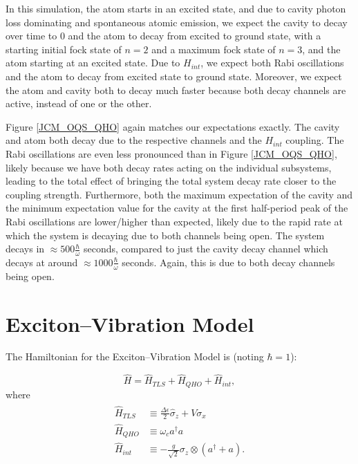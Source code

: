 \documentclass[12pt]{article}
\begin{document}
In this simulation, the atom starts in an excited state, and due to cavity photon loss dominating and spontaneous atomic emission, we expect the cavity to decay over time to 0 and the atom to decay from excited to ground state, with a starting initial fock state of $n=2$ and a maximum fock state of $n=3$, and the atom starting at an excited state. Due to $H_{int}$, we expect both Rabi oscillations and the atom to decay from excited state to ground state. Moreover, we expect the atom and cavity both to decay much faster because both decay channels are active, instead of one or the other. 

Figure \ref{JCM_OQS_QHO} again matches our expectations exactly. The cavity and atom both decay due to the respective channels and the $H_{int}$ coupling. The Rabi oscillations are even less pronounced than in Figure \ref{JCM_OQS_QHO}, likely because we have both decay rates acting on the individual subsystems, leading to the total effect of bringing the total system decay rate closer to the coupling strength. Furthermore, both the maximum expectation of the cavity and the minimum expectation value for the cavity at the first half-period peak of the Rabi oscillations are lower/higher than expected, likely due to the rapid rate at which the system is decaying due to both channels being open. The system decays in $\approx 500 \frac{\hbar}{\omega}$ seconds, compared to just the cavity decay channel which decays at around $\approx 1000 \frac{\hbar}{\omega}$ seconds. Again, this is due to both decay channels being open.

\section{Exciton--Vibration Model}

The Hamiltonian for the Exciton--Vibration Model is (noting $\hbar = 1$):

\begin{equation}
    \hat{H} = \hat{H}_{TLS} + \hat{H}_{QHO} + \hat{H}_{int}, 
\end{equation} \label{EV_H}
where 
\begin{align*}
    \begin{aligned}
        \hat{H}_{TLS} &\equiv \frac{\Delta\epsilon}{2}\hat{\sigma}_z + V\sigma_x \\
        \hat{H}_{QHO} &\equiv \omega_ca^\dagger a \\
        \hat{H}_{int} &\equiv -\frac{g}{\sqrt{2}}\sigma_z \otimes(a^\dagger + a).
    \end{aligned}
\end{align*}
\end{document}
